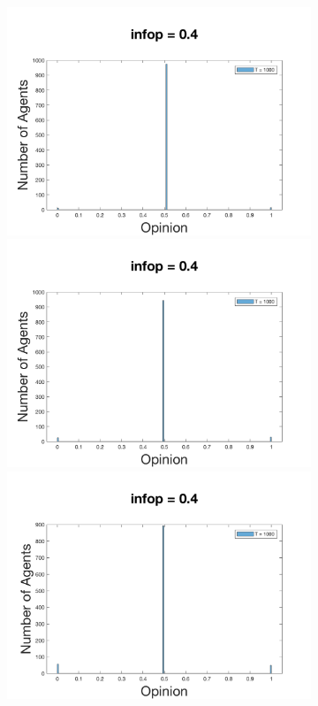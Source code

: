 \documentclass[11pt]{article}
\begin{document}
\begin{figure}[!htb]
\begin{subfigure}[!htb]{\textwidth}
  \includegraphics[width=\linewidth]{p_5/gen_plot_201712171365712320e+01.png}
\endminipage\hfill
{}
  \includegraphics[width=\linewidth]{p_10/gen_plot_2017121712594914222e+00.png}
\endminipage\hfill
{}
  \includegraphics[width=\linewidth]{p_20/gen_plot_201712171361841616e+01.png}
\endminipage
\end{subfigure}


\end{figure}
\end{document}
